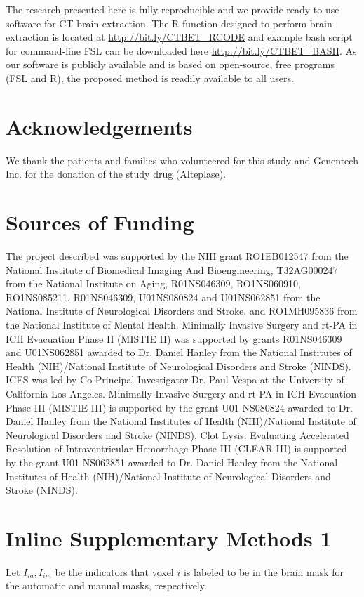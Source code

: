 %

The research presented here is fully reproducible and we provide ready-to-use software for CT brain extraction. The R function designed to perform brain extraction is located at
\url{http://bit.ly/CTBET_RCODE} and example bash script for command-line FSL can be downloaded here \url{http://bit.ly/CTBET_BASH}.  As our software is publicly available and is based on open-source, free programs (FSL and R), the proposed method is readily available to all users.

\section*{Acknowledgements}
We thank the patients and families who volunteered for this study and Genentech Inc. for the donation of the study drug (Alteplase).

\section*{Sources of Funding}
The project described was supported by the NIH grant RO1EB012547 from the National Institute of Biomedical Imaging And Bioengineering, T32AG000247 from the National Institute on Aging, R01NS046309, RO1NS060910, RO1NS085211, R01NS046309, U01NS080824 and U01NS062851 from the National Institute of Neurological Disorders and Stroke, and RO1MH095836 from the National Institute of Mental Health. Minimally Invasive Surgery and rt-PA in ICH Evacuation Phase II (MISTIE II) was supported by grants R01NS046309 and U01NS062851 awarded to Dr. Daniel Hanley from the National Institutes of Health (NIH)/National Institute of Neurological Disorders and Stroke (NINDS).  ICES was led by Co-Principal Investigator Dr. Paul Vespa at the University of California Los Angeles. Minimally Invasive Surgery and rt-PA in ICH Evacuation Phase III (MISTIE III) is supported by the grant U01 NS080824 awarded to Dr. Daniel Hanley from the National Institutes of Health (NIH)/National Institute of Neurological Disorders and Stroke (NINDS). Clot Lysis: Evaluating Accelerated Resolution of Intraventricular Hemorrhage Phase III (CLEAR III) is supported by the grant U01 NS062851 awarded to Dr. Daniel Hanley from the National Institutes of Health (NIH)/National Institute of Neurological Disorders and Stroke (NINDS). 

\newpage
\section*{Inline Supplementary Methods 1}
Let $I_{ia}, I_{im}$ be the indicators that voxel $i$ is labeled to be in the brain mask for the automatic and manual masks, respectively.  

